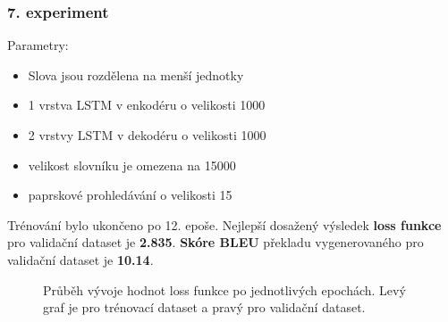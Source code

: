 \subsubsection{7. experiment}\label{experiment7}
Parametry:
\begin{itemize}
  \item Slova jsou rozdělena na menší jednotky
  \item 1 vrstva LSTM v enkodéru o velikosti 1000
  \item 2 vrstvy LSTM v dekodéru o velikosti 1000
  \item velikost slovníku je omezena na 15000
  \item paprskové prohledávání o velikosti 15
\end{itemize}

Trénování bylo ukončeno po 12. epoše. Nejlepší dosažený výsledek \textbf{loss funkce} pro validační dataset je \textbf{2.835}. \textbf{Skóre BLEU} překladu vygenerovaného pro validační dataset je \textbf{10.14}.

\begin{figure}[H]
    \begin{center}
    \end{center}
	\caption{Průběh vývoje hodnot loss funkce po jednotlivých epochách. Levý graf je pro trénovací dataset a pravý pro validační dataset.}
\end{figure}


